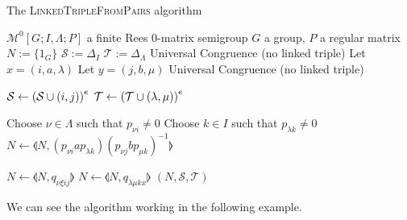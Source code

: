 \begin{algorithm}
\caption{The \textsc{LinkedTripleFromPairs} algorithm}
\label{alg:pairs-to-linked-triple}
\begin{algorithmic}[1]
    \Require $\mathcal{M}^0[G;I,\Lambda;P]$ a finite Rees 0-matrix semigroup
    \Require $G$ a group, $P$ a regular matrix
      \State $N := \{1_G\}$
      \State $\mathcal{S} := \Delta_I$
      \State $\mathcal{T} := \Delta_\Lambda$
          \State \Continue
          \State \Return Universal Congruence (no linked triple)
        \EndIf
        \State Let $x=(i,a,\lambda)$
        \State Let $y=(j,b,\mu)$
          \State \Return Universal Congruence (no linked triple)
        \EndIf

        \State $\mathcal{S} \gets \left(\mathcal{S} \cup (i,j)\right)^e$
        \State $\mathcal{T} \gets \left(\mathcal{T} \cup (\lambda, \mu)\right)^e$

        \State Choose $\nu \in \Lambda$ such that $p_{\nu i} \neq 0$
        \State Choose $k \in I$ such that $p_{\lambda k} \neq 0$
        \State $N \gets \llangle N, (p_{\nu i}ap_{\lambda k})(p_{\nu j}bp_{\mu k})^{-1} \rrangle$

          \State $N \gets \llangle N, q_{\nu \xi i j} \rrangle$
        \EndFor
          \State $N \gets \llangle N, q_{\lambda \mu k x} \rrangle$
        \EndFor
      \EndFor
      \State \Return $(N,\mathcal{S},\mathcal{T})$
    \EndProcedure
\end{algorithmic}
\end{algorithm}

We can see the algorithm working in the following example.

